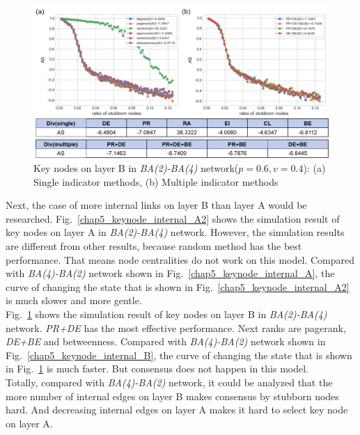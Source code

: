 \begin{figure}[!htb]
	\centering
	\includegraphics[width=\hsize]{figure/chap5_keynode_internal_B2.png}
	\caption{Key nodes on layer B in \textit{BA(2)-BA(4)} network($p=0.6, v=0.4$):
		(a) Single indicator methods, (b) Multiple indicator methods}
	\label{chap5_keynode_internal_B2}
\end{figure}
Next, the case of more internal links on layer B than layer A would be researched. 
Fig.~\ref{chap5_keynode_internal_A2} shows the simulation result of key nodes on layer A in \textit{BA(2)-BA(4)} network. However, the simulation results are different from other results, because random method has the best performance. That means node centralities do not work on this model. Compared with \textit{BA(4)-BA(2)} network shown in Fig.~\ref{chap5_keynode_internal_A}, the curve of changing the state that is shown in Fig.~\ref{chap5_keynode_internal_A2}  is much slower and more gentle.\\
Fig.~\ref{chap5_keynode_internal_B2} shows the simulation result of key nodes on layer B in \textit{BA(2)-BA(4)} network. \textit{PR+DE} has the most effective performance. Next ranks are pagerank, \textit{DE+BE} and betweenness. Compared with \textit{BA(4)-BA(2)} network shown in Fig.~\ref{chap5_keynode_internal_B}, the curve of changing the state that is shown in Fig.~\ref{chap5_keynode_internal_B2} is much faster. But consensus does not happen in this model. \\ 
Totally, compared with \textit{BA(4)-BA(2)} network, it could be analyzed that the more number of internal edges on layer B makes consensus by stubborn nodes hard. And decreasing internal edges on layer A makes it hard to select key node on layer A.\\   

